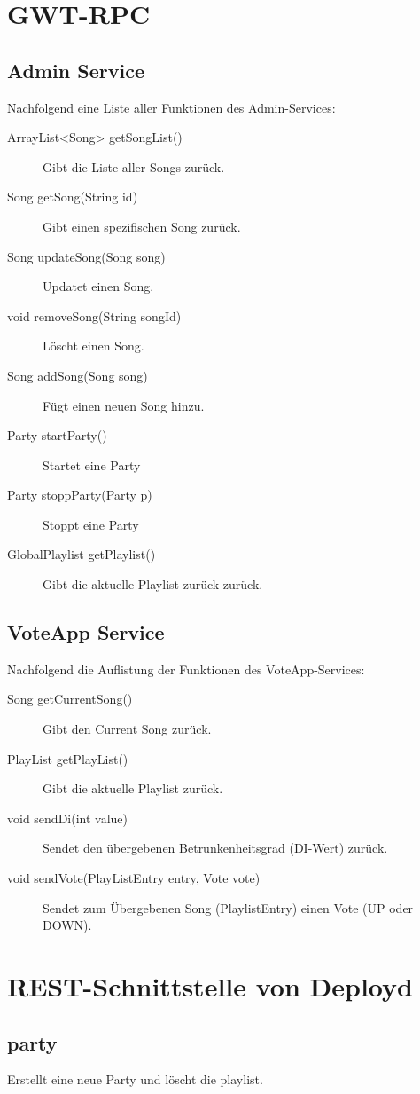 \section{GWT-RPC}

\subsection{Admin Service}
Nachfolgend eine Liste aller Funktionen des Admin-Services:
\begin{description}
	\item[ArrayList<Song> getSongList()] Gibt die Liste aller Songs zurück.
	\item[Song getSong(String id)] Gibt einen spezifischen Song zurück.
	\item[Song updateSong(Song song)] Updatet einen Song.
	\item[void removeSong(String songId)]	Löscht einen Song.
	\item[Song addSong(Song song)] Fügt einen neuen Song hinzu.
	\item[Party startParty()]	Startet eine Party
	\item[Party stoppParty(Party p)] Stoppt eine Party
	\item[GlobalPlaylist getPlaylist()] Gibt die aktuelle Playlist zurück zurück.
\end{description}


\subsection{VoteApp Service}
Nachfolgend die Auflistung der Funktionen des VoteApp-Services:
\begin{description}
	\item[Song getCurrentSong()] Gibt den Current Song zurück.
	\item[PlayList getPlayList()]	Gibt die aktuelle Playlist zurück.
	\item[void sendDi(int value)] Sendet den übergebenen Betrunkenheitsgrad (DI-Wert) zurück.
	\item[void sendVote(PlayListEntry entry, Vote vote)] Sendet zum Übergebenen Song (PlaylistEntry) einen Vote (UP oder DOWN).
\end{description}

\section{REST-Schnittstelle von Deployd}

\subsection{party}
\label{service:party}
Erstellt eine neue Party und löscht die playlist.

